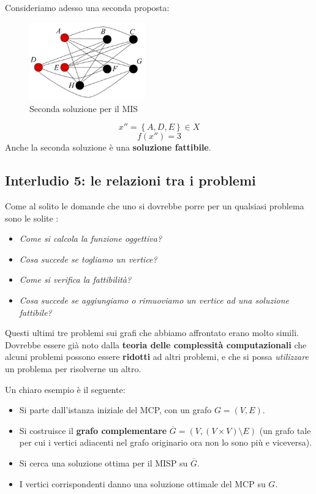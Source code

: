 \documentclass{article}
\begin{document}
Consideriamo adesso una seconda proposta:
\begin{figure}[H]
    \centering
    \includegraphics[width=5cm]{images/MIS_sol2.png}
    \caption{Seconda soluzione per il MIS}
    \label{fig:MIS_2}
\end{figure}

$$x''=\left\{A,D,E\right\}\in X$$
$$f(x'')=3$$
Anche la seconda soluzione è una \textbf{soluzione fattibile}.

\subsection{Interludio 5: le relazioni tra i problemi}
Come al solito le domande che uno si dovrebbe porre per un qualsiasi problema sono le solite :
\begin{itemize}
    \item \textit{Come si calcola la funzione oggettiva?}
    \item \textit{Cosa succede se togliamo un vertice?}
    \item \textit{Come si verifica la fattibilità?}
    \item \textit{Cosa succede se aggiungiamo o rimuoviamo un vertice ad una soluzione fattibile?}
\end{itemize}

Questi ultimi tre problemi sui grafi che abbiamo affrontato erano molto simili. Dovrebbe essere già noto
dalla \textbf{teoria delle complessità computazionali} che alcuni problemi possono essere \textbf{ridotti} ad altri
problemi, e che si possa \textit{utilizzare} un problema per risolverne un altro.

Un chiaro esempio è il seguente:
\begin{itemize}
    \item Si parte dall'istanza iniziale del MCP, con un grafo $G=(V,E)$.
    \item Si costruisce il \textbf{grafo complementare} $\overline{G}=(V,(V\times V)\setminus E)$ (un grafo tale
          per cui i vertici adiacenti nel grafo originario ora non lo sono più e viceversa).
    \item Si cerca una soluzione ottima per il MISP su $\overline{G}$.
    \item I vertici corrispondenti danno una soluzione ottimale del MCP su $G$.
\end{itemize}
\end{document}
